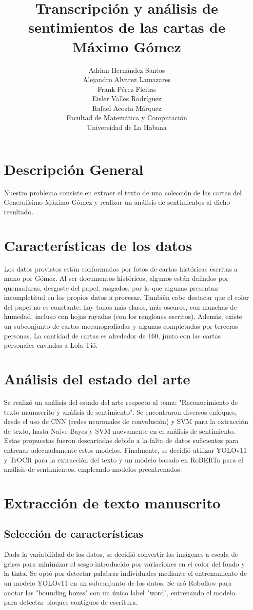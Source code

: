 \documentclass[11pt,a4paper]{article}
\title{Transcripción y análisis de sentimientos de las cartas de Máximo Gómez}
\author{
    Adrian Hernández Santos\\
    Alejandro Alvarez Lamazares\\
    Frank Pérez Fleitas\\
    Eisler Valles Rodríguez\\
    \vspace{5cm}
    Rafael Acosta Márquez\\
    \small{Facultad de Matemática y Computación}\\
    \small{Universidad de La Habana}
}
\begin{document}
\maketitle

\newpage

\section{Descripción General}
Nuestro problema consiste en extraer el texto de una colección de las cartas del Generalísimo Máximo Gómez y realizar un análisis de sentimientos al dicho resultado.

\section{Características de los datos}
Los datos provistos están conformados por fotos de cartas históricas escritas a mano por Gómez. Al ser documentos históricos, algunos están dañados por quemaduras, desgaste del papel, rasgados, por lo que algunas presentan incompletitud en los propios datos a procesar. También cabe destacar que el color del papel no es constante, hay tonos más claros, más oscuros, con manchas de humedad, incluso con hojas rayadas (con los renglones escritos). Además, existe un subconjunto de cartas mecanografiadas y algunas completadas por terceras personas. La cantidad de cartas es alrededor de 160, junto con las cartas personales enviadas a Lola Tió.

\section{Análisis del estado del arte}
Se realizó un análisis del estado del arte respecto al tema: "Reconocimiento de texto manuscrito y análisis de sentimiento". Se encontraron diversos enfoques, desde el uso de CNN (redes neuronales de convolución) y SVM para la extracción de texto, hasta Naive Bayes y SVM nuevamente en el análisis de sentimiento. Estas propuestas fueron descartadas debido a la falta de datos suficientes para entrenar adecuadamente estos modelos. Finalmente, se decidió utilizar YOLOv11 y TrOCR para la extracción del texto y un modelo basado en RoBERTa para el análisis de sentimientos, empleando modelos preentrenados.

\section{Extracción de texto manuscrito}
\subsection{Selección de características}
Dada la variabilidad de los datos, se decidió convertir las imágenes a escala de grises para minimizar el sesgo introducido por variaciones en el color del fondo y la tinta. Se optó por detectar palabras individuales mediante el entrenamiento de un modelo YOLOv11 en un subconjunto de los datos. Se usó Roboflow para anotar las "bounding boxes" con un único label "word", entrenando el modelo para detectar bloques contiguos de escritura.
\end{document}
